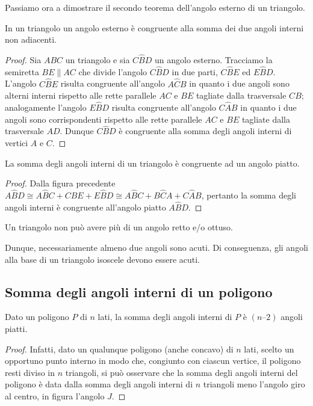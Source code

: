Passiamo ora a dimostrare il secondo teorema dell'angolo esterno di un triangolo.
\begin{teorema}
In un triangolo un angolo esterno è congruente alla somma dei due angoli interni non adiacenti.
\end{teorema}

\begin{proof}
Sia $ABC$ un triangolo e sia $C\widehat{B}D$ un angolo esterno. Tracciamo la semiretta $BE\parallel AC$ che divide l'angolo $C\widehat{B}D$ in due parti, $C\widehat{B}E$ ed $E\widehat{B}D$. L'angolo $C\widehat{B}E$ risulta congruente all'angolo $A\widehat{C}B$ in quanto i due angoli sono alterni interni rispetto alle rette parallele $AC$ e $BE$ tagliate dalla trasversale $CB$; analogamente l'angolo $E\widehat{B}D$ risulta congruente all'angolo $C\widehat{A}B$ in quanto i due angoli sono corrispondenti rispetto alle rette parallele $AC$ e $BE$ tagliate dalla trasversale $AD$. Dunque $C\widehat{B}D$ è congruente alla somma degli angoli interni di vertici $A$ e $C$.
\end{proof}

\begin{corollario}
La somma degli angoli interni di un triangolo è congruente ad un angolo piatto.
\end{corollario}
\begin{proof}
Dalla figura precedente $A\widehat{B}D\cong A\widehat{B}C + C\widehat{B}E + E\widehat{B}D\cong A\widehat{B}C + B\widehat{C}A + C\widehat{A}B$, pertanto la somma degli angoli interni è congruente all'angolo piatto $A\widehat{B}D$.
\end{proof}
\begin{corollario}
Un triangolo non può avere più di un angolo retto e/o ottuso.
\end{corollario}
Dunque, necessariamente almeno due angoli sono acuti. Di conseguenza, gli angoli alla base di un triangolo isoscele devono essere acuti.

\subsection{Somma degli angoli interni di un poligono}

\begin{teorema}
Dato un poligono $P$ di $n$ lati, la somma degli angoli interni di $P$ è $(n – 2)$ angoli piatti.
\end{teorema}
\begin{proof}
Infatti, dato un qualunque poligono (anche concavo) di $n$ lati, scelto un opportuno punto interno in modo che, congiunto con ciascun vertice, il poligono resti diviso in $n$ triangoli, si può osservare che la somma degli angoli interni del poligono è data dalla somma degli angoli interni di $n$ triangoli meno l'angolo giro al centro, in figura l'angolo $J$.
\end{proof}

